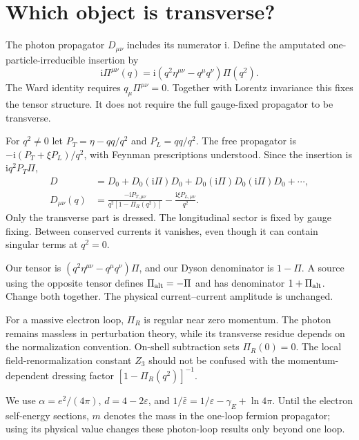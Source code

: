 \documentclass[11pt]{article}
\newcommand{\ii}{\mathrm i}
\newcommand{\eps}{\varepsilon}
\begin{document}
\section{Which object is transverse?}
The photon propagator \(D_{\mu\nu}\) includes its numerator \(\ii\).
Define the amputated one-particle-irreducible insertion by
\begin{equation}
 \ii\Pi^{\mu\nu}(q)=\ii(q^2\eta^{\mu\nu}-q^\mu q^\nu)\Pi(q^2).
 \label{eq:pidef}
\end{equation}
The Ward identity requires \(q_\mu\Pi^{\mu\nu}=0\). Together with Lorentz
invariance this fixes the tensor structure. It does not require the
full gauge-fixed propagator to be transverse.

For \(q^2\ne0\) let \(P_T=\eta-qq/q^2\) and \(P_L=qq/q^2\).
The free propagator is \(-\ii(P_T+\xi P_L)/q^2\), with Feynman
prescriptions understood. Since the insertion is \(\ii q^2P_T\Pi\),
\begin{align}
 D&=D_0+D_0(\ii\Pi)D_0+D_0(\ii\Pi)D_0(\ii\Pi)D_0+\cdots,\\
 D_{\mu\nu}(q)&=\frac{-\ii P_{T,\mu\nu}}{q^2[1-\Pi_R(q^2)]}
              -\frac{\ii\xi P_{L,\mu\nu}}{q^2}.
 \label{eq:dysonphoton}
\end{align}
Only the transverse part is dressed. The longitudinal sector is fixed
by gauge fixing. Between conserved currents it vanishes, even though
it can contain singular terms at \(q^2=0\).

\begin{keyidea}
Our tensor is \((q^2\eta^{\mu\nu}-q^\mu q^\nu)\Pi\), and our Dyson
denominator is \(1-\Pi\). A source using the opposite tensor defines
\(\Pi_{\rm alt}=-\Pi\) and has denominator \(1+\Pi_{\rm alt}\).
Change both together. The physical current--current amplitude is unchanged.
\end{keyidea}
For a massive electron loop, \(\Pi_R\) is regular near zero momentum.
The photon remains massless in perturbation theory, while its transverse
residue depends on the normalization convention. On-shell subtraction
sets \(\Pi_R(0)=0\). The local field-renormalization constant \(Z_3\)
should not be confused with the momentum-dependent dressing factor
\([1-\Pi_R(q^2)]^{-1}\).

We use \(\alpha=e^2/(4\pi)\), \(d=4-2\eps\), and
\(1/\bar\eps=1/\eps-\gamma_E+\ln4\pi\). Until the electron self-energy
sections, \(m\) denotes the mass in the one-loop fermion propagator;
using its physical value changes these photon-loop results only beyond
one loop.
\end{document}
